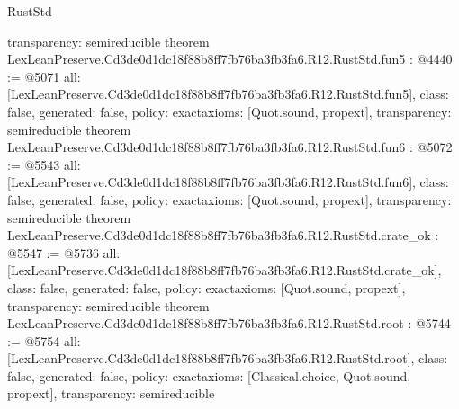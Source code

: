 \begin{lexlean}{RustStd}
\begin{coremodule}
{  transparency: semireducible
}
theorem LexLeanPreserve.Cd3de0d1dc18f88b8ff7fb76ba3fb3fa6.R12.RustStd.fun5 : @4440 := @5071 {
  all: [LexLeanPreserve.Cd3de0d1dc18f88b8ff7fb76ba3fb3fa6.R12.RustStd.fun5],
  class: false,
  generated: false,
  policy: exact{axioms: [Quot.sound, propext]},
  transparency: semireducible
}
theorem LexLeanPreserve.Cd3de0d1dc18f88b8ff7fb76ba3fb3fa6.R12.RustStd.fun6 : @5072 := @5543 {
  all: [LexLeanPreserve.Cd3de0d1dc18f88b8ff7fb76ba3fb3fa6.R12.RustStd.fun6],
  class: false,
  generated: false,
  policy: exact{axioms: [Quot.sound, propext]},
  transparency: semireducible
}
theorem LexLeanPreserve.Cd3de0d1dc18f88b8ff7fb76ba3fb3fa6.R12.RustStd.crate_ok : @5547 := @5736 {
  all: [LexLeanPreserve.Cd3de0d1dc18f88b8ff7fb76ba3fb3fa6.R12.RustStd.crate_ok],
  class: false,
  generated: false,
  policy: exact{axioms: [Quot.sound, propext]},
  transparency: semireducible
}
theorem LexLeanPreserve.Cd3de0d1dc18f88b8ff7fb76ba3fb3fa6.R12.RustStd.root : @5744 := @5754 {
  all: [LexLeanPreserve.Cd3de0d1dc18f88b8ff7fb76ba3fb3fa6.R12.RustStd.root],
  class: false,
  generated: false,
  policy: exact{axioms: [Classical.choice, Quot.sound, propext]},
  transparency: semireducible
}


\end{coremodule}
\end{lexlean}
